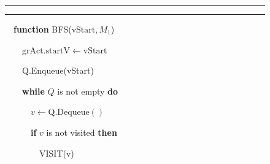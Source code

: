 \renewcommand{\figurename}{\protect\bf Алгоритм}


\setcounter{figure}{0}





\begin{figure}[b]


\hrule





\vspace*{-5pt}










\vspace*{4pt}





\hrule





\vspace*{3pt}





\ \ \textbf{function} {\footnotesize BFS}({$\mathrm{vStart}, M_1$})





\ \ \ \ {$\mathrm{grAct.startV} \gets \mathrm{vStart}$}





\ \ \ \ {Q.Enqueue(vStart)}





\ \ \ \ \textbf{while} {$Q$ is not empty \textbf{do}}





\ \  \ \ \  \ {$v \gets \mathrm{Q.Dequeue}()$}





\ \ \ \ \ \  \textbf{if} {$v$ is not visited} \textbf{then}





\ \ \ \ \ \ \ \ VISIT(v)






\end{figure}
